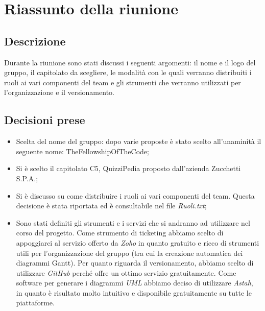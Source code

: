 \section{Riassunto della riunione}
\subsection{Descrizione}

Durante la riunione sono stati discussi i seguenti argomenti: il nome e il logo del gruppo, il capitolato da scegliere, le modalità con le quali verranno distribuiti i ruoli ai vari componenti del team e gli strumenti che verranno utilizzati per l'organizzazione e il versionamento.

\subsection{Decisioni prese}
\begin{itemize}
\item Scelta del nome del gruppo: dopo varie proposte è stato scelto all'unaminità il seguente nome: TheFellowshipOfTheCode;
\item Si è scelto il capitolato C5, QuizziPedia proposto dall'azienda Zucchetti S.P.A.;
\item Si è discusso su come distribuire i ruoli ai vari componenti del team. Questa decisione è stata riportata ed è consultabile nel file \textsl{Ruoli.txt};
\item Sono stati definiti gli strumenti e i servizi che si andranno ad utilizzare nel corso del progetto. Come strumento di ticketing abbiamo scelto di appoggiarci al servizio offerto da \textit{Zoho} in quanto gratuito e ricco di strumenti utili per l'organizzazione del gruppo (tra cui la creazione automatica dei diagrammi Gantt). Per quanto riguarda il versionamento, abbiamo scelto di utilizzare \textit{GitHub} perché offre un ottimo servizio gratuitamente. Come software per generare i diagrammi \textit{UML} abbiamo deciso di utilizzare \textit{Astah}, in quanto è risultato molto intuitivo e disponibile gratuitamente su tutte le piattaforme.
\end{itemize}